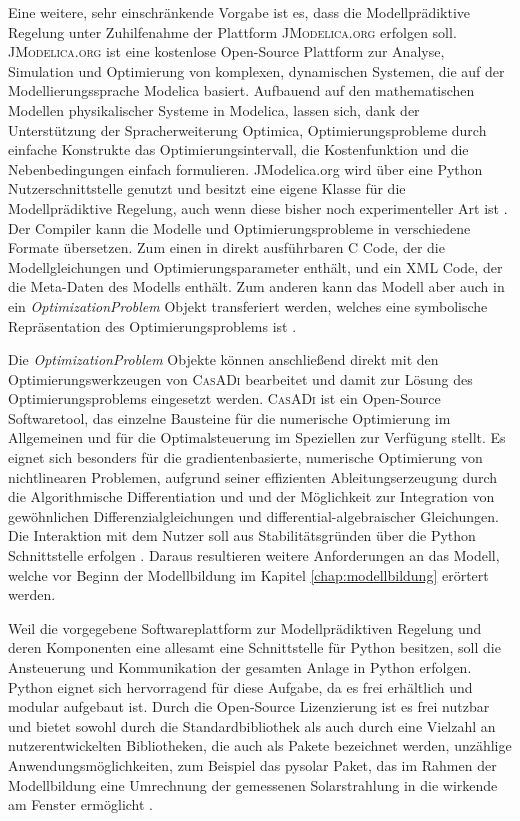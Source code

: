 Eine weitere, sehr einschränkende Vorgabe ist es, dass die Modellprädiktive Regelung unter Zuhilfenahme der Plattform \textsc{JModelica.org} erfolgen soll. \textsc{JModelica.org} ist eine kostenlose Open-Source Plattform	 zur Analyse, Simulation und Optimierung von komplexen, dynamischen Systemen, die auf der Modellierungssprache Modelica basiert. Aufbauend auf den mathematischen Modellen physikalischer Systeme in Modelica, lassen sich, dank der Unterstützung der Spracherweiterung Optimica, Optimierungsprobleme durch einfache Konstrukte das Optimierungsintervall, die Kostenfunktion und die Nebenbedingungen einfach formulieren. JModelica.org wird über eine Python Nutzerschnittstelle genutzt und besitzt eine eigene Klasse für die Modellprädiktive Regelung, auch wenn diese bisher noch experimenteller Art ist \cite[S.~1f.]{jmod15}.
Der Compiler kann die Modelle und Optimierungsprobleme in verschiedene Formate übersetzen. Zum einen in direkt ausführbaren C Code, der die Modellgleichungen und Optimierungsparameter enthält, und ein XML Code, der die Meta-Daten des Modells enthält. Zum anderen kann das Modell aber auch in ein \textit{OptimizationProblem} Objekt transferiert werden, welches eine symbolische Repräsentation des Optimierungsproblems ist \cite[S.~12ff.]{jmod15}.

Die \textit{OptimizationProblem} Objekte können anschließend direkt mit den Optimierungswerkzeugen von \textsc{CasADi} bearbeitet und damit zur Lösung des Optimierungsproblems eingesetzt werden. \textsc{CasADi} ist ein Open-Source Softwaretool, das einzelne Bausteine für die numerische Optimierung im Allgemeinen und für die Optimalsteuerung im Speziellen zur Verfügung stellt. Es eignet sich besonders für die gradientenbasierte, numerische Optimierung von nichtlinearen Problemen, aufgrund seiner effizienten Ableitungserzeugung durch die Algorithmische Differentiation und und der Möglichkeit zur Integration von gewöhnlichen Differenzialgleichungen und differential-algebraischer Gleichungen. Die Interaktion mit dem Nutzer soll aus Stabilitätsgründen über die Python Schnittstelle erfolgen \cite[S.~5f.]{casadi}.
Daraus resultieren weitere Anforderungen an das Modell, welche vor Beginn der Modellbildung im Kapitel \ref{chap:modellbildung} erörtert werden.


Weil die vorgegebene Softwareplattform zur Modellprädiktiven Regelung und deren Komponenten eine allesamt eine Schnittstelle für Python besitzen, soll die Ansteuerung und Kommunikation der gesamten Anlage in Python erfolgen. Python eignet sich hervorragend für diese Aufgabe, da es frei erhältlich und modular aufgebaut ist. Durch die Open-Source Lizenzierung ist es frei nutzbar und bietet sowohl durch die Standardbibliothek als auch durch eine Vielzahl an nutzerentwickelten Bibliotheken, die auch als Pakete bezeichnet werden, unzählige Anwendungsmöglichkeiten, zum Beispiel das pysolar Paket, das im Rahmen der Modellbildung eine Umrechnung der gemessenen Solarstrahlung in die wirkende am Fenster ermöglicht \cite[S.~2f.]{python}.

